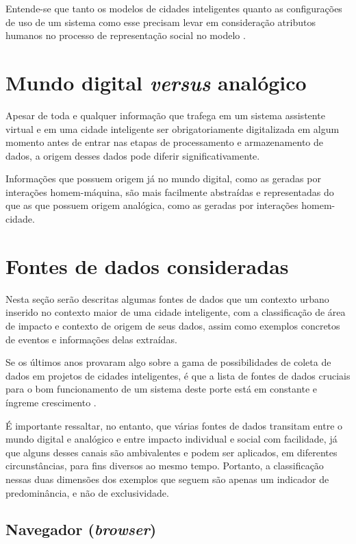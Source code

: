Entende-se que tanto os modelos de cidades inteligentes quanto as configurações de uso de um sistema como esse precisam levar em consideração atributos humanos no processo de representação social no modelo \cite{huso17}.

\section{Mundo digital \textit{versus} analógico} \label{s:mundo_digital_vs_analogico}

Apesar de toda e qualquer informação que trafega em um sistema assistente virtual e em uma cidade inteligente ser obrigatoriamente digitalizada em algum momento antes de entrar nas etapas de processamento e armazenamento de dados, a origem desses dados pode diferir significativamente.

Informações que possuem origem já no mundo digital, como as geradas por interações homem-máquina, são mais facilmente abstraídas e representadas do que as que possuem origem analógica, como as geradas por interações homem-cidade.

\section{Fontes de dados consideradas} \label{s:fontes_de_dados_consideradas}

Nesta seção serão descritas algumas fontes de dados que um contexto urbano inserido no contexto maior de uma cidade inteligente, com a classificação de área de impacto e contexto de origem de seus dados, assim como exemplos concretos de eventos e informações delas extraídas.

Se os últimos anos provaram algo sobre a gama de possibilidades de coleta de dados em projetos de cidades inteligentes, é que a lista de fontes de dados cruciais para o bom funcionamento de um sistema deste porte está em constante e íngreme crescimento \cite{lavaprotocols:smartcity}.

É importante ressaltar, no entanto, que várias fontes de dados transitam entre o mundo digital e analógico e entre impacto individual e social com facilidade, já que alguns desses canais são ambivalentes e podem ser aplicados, em diferentes circunstâncias, para fins diversos ao mesmo tempo. Portanto, a classificação nessas duas dimensões dos exemplos que seguem são apenas um indicador de predominância, e não de exclusividade.

\subsection{Navegador (\textit{browser})}

